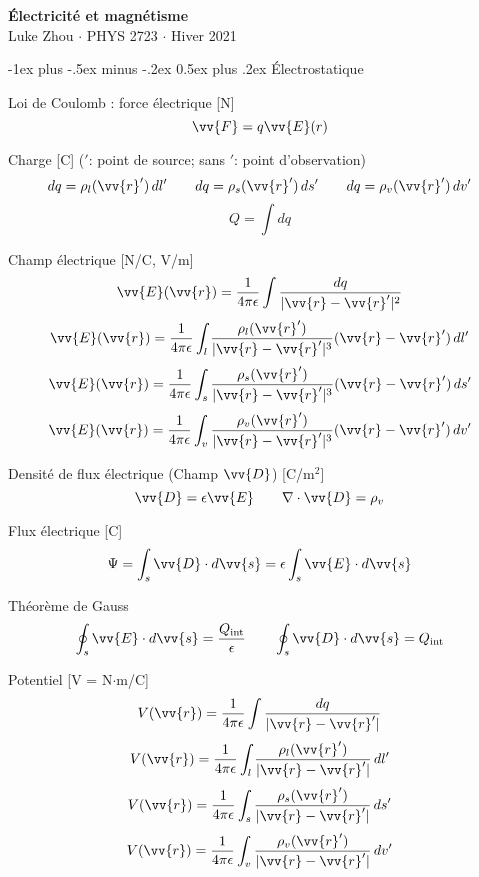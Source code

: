 \documentclass[10pt,landscape]{article}
\makeatletter
\renewcommand{\section}{\@startsection{section}{1}{0mm}%
                                {-1ex plus -.5ex minus -.2ex}%
                                {0.5ex plus .2ex}%
                                {\normalfont\large\bfseries}}
\makeatother
\begin{document}
\raggedright
\footnotesize
\begin{multicols}{3}


\setlength{\premulticols}{1pt}
\setlength{\postmulticols}{1pt}
\setlength{\multicolsep}{1pt}
\setlength{\columnsep}{2pt}

\begin{center}
     \Large{\textbf{Électricité et magnétisme}} \\
     \small{Luke Zhou $\cdot$ PHYS 2723 $\cdot$ Hiver 2021}
\end{center}

\section{Électrostatique}

Loi de Coulomb : force électrique [N]
 \[ \vv{F} = q\vv{E}(r) \] %

Charge  [C] ($'$: point de source; sans $'$: point d'observation)
\[  dq = \rho_l(\vv{r}') \,dl'  \qquad  dq = \rho_s(\vv{r}') \,ds'  \qquad dq = \rho_v(\vv{r}') \,dv'  \]
\[  Q = \int dq \]

Champ électrique [N/C, V/m]
\[ \vv{E}(\vv{r}) = \frac{1}{4\pi\epsilon} \int \frac{dq}{| \vv{r} - \vv{r}' |^2 }  \]
\[ \vv{E}(\vv{r}) = \frac{1}{4\pi\epsilon} \int_{l} \frac{\rho_l(\vv{r}')}{| \vv{r} - \vv{r}' |^3 } (\vv{r} - \vv{r}' )\,dl'  \]
%
\[\vv{E}(\vv{r}) = \frac{1}{4\pi\epsilon} \int_{s} \frac{\rho_s(\vv{r}')}{| \vv{r} - \vv{r}'|^3 } (\vv{r} - \vv{r}' )\,ds' \]
%
\[\vv{E}(\vv{r}) = \frac{1}{4\pi\epsilon} \int_{v} \frac{\rho_v(\vv{r}')}{| \vv{r} - \vv{r}' |^3 } (\vv{r} - \vv{r}' )\,dv'  \]

Densité de flux électrique (Champ $\vv{D}$)  [C/m${}^2$]
\[ \vv{D} = \epsilon\vv{E}
\qquad \nabla \cdot \vv{D} = \rho_v \]

Flux électrique [C]
\[ \Psi = \int_{s} \vv{D} \cdot d\vv{s} = \epsilon \int_{s} \vv{E} \cdot d\vv{s} \]

Théorème de Gauss
\[ \oint_s \vv{E}\cdot d\vv{s} = \frac{Q_\text{int}}{\epsilon}
\qquad  \oint_s \vv{D}\cdot d\vv{s} = Q_\text{int} \]

Potentiel [V = N$\cdot$m/C]
\[ V(\vv{r}) = \frac{1}{4\pi\epsilon} \int \frac{dq}{| \vv{r} - \vv{r}' | }  \]
\[ {V}(\vv{r}) = \frac{1}{4\pi\epsilon} \int_{l} \frac{\rho_l(\vv{r}')}{| \vv{r} - \vv{r}' | } \,dl' \]
\[  {V}(\vv{r}) = \frac{1}{4\pi\epsilon} \int_{s} \frac{\rho_s(\vv{r}')}{| \vv{r} - \vv{r}'| } \,ds'  \]
%
\[ {V}(\vv{r}) = \frac{1}{4\pi\epsilon} \int_{v} \frac{\rho_v(\vv{r}')}{| \vv{r} - \vv{r}' | } \,dv'  \]


\end{multicols}
\end{document}
